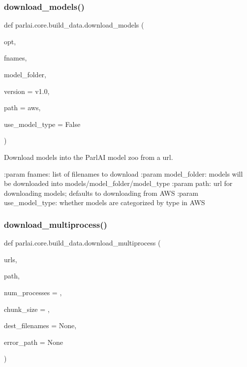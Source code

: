 \subsubsection{\texorpdfstring{download\+\_\+models()}{download\_models()}}
{\footnotesize\ttfamily def parlai.\+core.\+build\+\_\+data.\+download\+\_\+models (\begin{DoxyParamCaption}\item[{}]{opt,  }\item[{}]{fnames,  }\item[{}]{model\+\_\+folder,  }\item[{}]{version = {\ttfamily \textquotesingle{}v1.0\textquotesingle{}},  }\item[{}]{path = {\ttfamily \textquotesingle{}aws\textquotesingle{}},  }\item[{}]{use\+\_\+model\+\_\+type = {\ttfamily False} }\end{DoxyParamCaption})}

\begin{DoxyVerb}Download models into the ParlAI model zoo from a url.

:param fnames: list of filenames to download
:param model_folder: models will be downloaded into models/model_folder/model_type
:param path: url for downloading models; defaults to downloading from AWS
:param use_model_type: whether models are categorized by type in AWS
\end{DoxyVerb}
 \mbox{\label{namespaceparlai_1_1core_1_1build__data_ae259aeb321a77560fbcd23028178c897}} 
\subsubsection{\texorpdfstring{download\+\_\+multiprocess()}{download\_multiprocess()}}
{\footnotesize\ttfamily def parlai.\+core.\+build\+\_\+data.\+download\+\_\+multiprocess (\begin{DoxyParamCaption}\item[{}]{urls,  }\item[{}]{path,  }\item[{}]{num\+\_\+processes = {},  }\item[{}]{chunk\+\_\+size = {},  }\item[{}]{dest\+\_\+filenames = {\ttfamily None},  }\item[{}]{error\+\_\+path = {\ttfamily None} }\end{DoxyParamCaption})}

